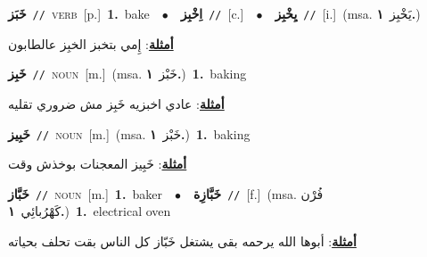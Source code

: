 \documentclass[10pt,a4paper,twoside]{article} %
\begin{document}
\begin{multicols}{2}
{\setlength\topsep{0pt}\textbf{\foreignlanguage{arabic}{خَبَز}}\ {\color{gray}\texttt{//}\color{black}}\ \textsc{verb}\ [p.]\ \textbf{1.}~bake\ \ $\bullet$\ \ \setlength\topsep{0pt}\textbf{\foreignlanguage{arabic}{اِخْبِز}}\ {\color{gray}\texttt{//}\color{black}}\ [c.]\ \ $\bullet$\ \ \setlength\topsep{0pt}\textbf{\foreignlanguage{arabic}{يِخْبِز}}\ {\color{gray}\texttt{//}\color{black}}\ [i.]\ \color{gray}(msa. \foreignlanguage{arabic}{يَخْبِز}~\foreignlanguage{arabic}{\textbf{١.}})\color{black}\  \begin{flushright}\color{gray}\foreignlanguage{arabic}{\textbf{\underline{\foreignlanguage{arabic}{أمثلة}}}: إِمي بتخبز الخبِز عالطابون}\end{flushright}\color{black}} \vspace{2mm}

{\setlength\topsep{0pt}\textbf{\foreignlanguage{arabic}{خَبِز}}\ {\color{gray}\texttt{//}\color{black}}\ \textsc{noun}\ [m.]\ \color{gray}(msa. \foreignlanguage{arabic}{خَبْز}~\foreignlanguage{arabic}{\textbf{١.}})\color{black}\ \textbf{1.}~baking\  \begin{flushright}\color{gray}\foreignlanguage{arabic}{\textbf{\underline{\foreignlanguage{arabic}{أمثلة}}}: عادي اخبزيه خَبِز مش ضروري تقليه}\end{flushright}\color{black}} \vspace{2mm}

{\setlength\topsep{0pt}\textbf{\foreignlanguage{arabic}{خَبِيز}}\ {\color{gray}\texttt{//}\color{black}}\ \textsc{noun}\ [m.]\ \color{gray}(msa. \foreignlanguage{arabic}{خَبْز}~\foreignlanguage{arabic}{\textbf{١.}})\color{black}\ \textbf{1.}~baking\  \begin{flushright}\color{gray}\foreignlanguage{arabic}{\textbf{\underline{\foreignlanguage{arabic}{أمثلة}}}: خَبِيز المعجنات بوخذش وقت}\end{flushright}\color{black}} \vspace{2mm}

{\setlength\topsep{0pt}\textbf{\foreignlanguage{arabic}{خَبَّاز}}\ {\color{gray}\texttt{//}\color{black}}\ \textsc{noun}\ [m.]\ \textbf{1.}~baker\ \ $\bullet$\ \ \setlength\topsep{0pt}\textbf{\foreignlanguage{arabic}{خَبَّازِة}}\ {\color{gray}\texttt{//}\color{black}}\ [f.]\ \color{gray}(msa. \foreignlanguage{arabic}{فُرْن كَهْرُبائِي}~\foreignlanguage{arabic}{\textbf{١.}})\color{black}\ \textbf{1.}~electrical oven\  \begin{flushright}\color{gray}\foreignlanguage{arabic}{\textbf{\underline{\foreignlanguage{arabic}{أمثلة}}}: أبوها الله يرحمه بقى يشتغل خَبّاز كل الناس بقت تحلف بحياته}\end{flushright}\color{black}} \vspace{2mm}


\end{multicols}
\end{document}
